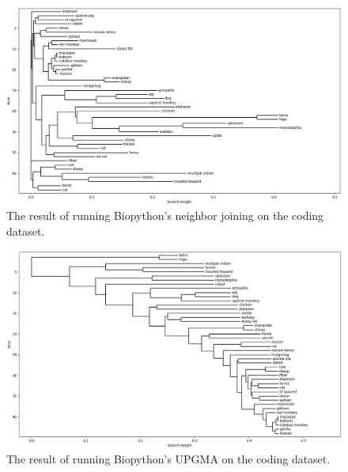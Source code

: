 \documentclass[11pt,twocolumn]{article}
\begin{document}
\begin{figure}
	\centering
	\includegraphics[width=0.95\linewidth]{img/nj_coding_biopython.png}
	\caption{The result of running Biopython's neighbor joining on the coding dataset.}
	\label{fig:nj_coding_bio}
\end{figure}

\begin{figure}
\centering
\includegraphics[width=0.95\linewidth]{img/upgma_coding_biopython.png}
\caption{The result of running Biopython's UPGMA on the coding dataset.}
\label{fig:upgma_coding_bio}
\end{figure}
\end{document}
